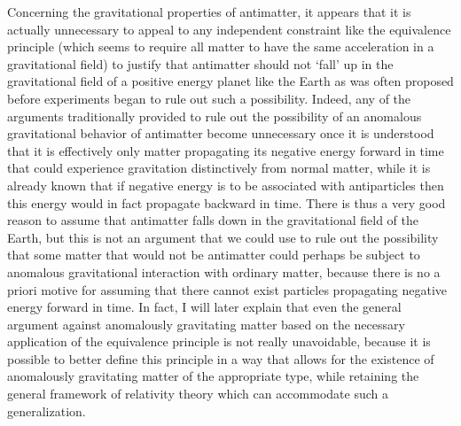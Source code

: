 \documentclass[notitlepage,12pt]{report}
\begin{document}
\noindent Concerning the gravitational properties of antimatter, it appears that it is actually unnecessary to appeal to any independent constraint like the equivalence principle (which seems to require all matter to have the same acceleration in a gravitational field) to justify that antimatter should not `fall' up in the gravitational field of a positive energy planet like the Earth as was often proposed before experiments began to rule out such a possibility. Indeed, any of the arguments traditionally provided to rule out the possibility of an anomalous gravitational behavior of antimatter become unnecessary once it is understood that it is effectively only matter propagating its negative energy forward in time that could experience gravitation distinctively from normal matter, while it is already known that if negative energy is to be associated with antiparticles then this energy would in fact propagate backward in time. There is thus a very good reason to assume that antimatter falls down in the gravitational field of the Earth, but this is not an argument that we could use to rule out the possibility that some matter that would not be antimatter could perhaps be subject to anomalous gravitational interaction with ordinary matter, because there is no a priori motive for assuming that there cannot exist particles propagating negative energy forward in time. In fact, I will later explain that even the general argument against anomalously gravitating matter based on the necessary application of the equivalence principle is not really unavoidable, because it is possible to better define this principle in a way that allows for the existence of anomalously gravitating matter of the appropriate type, while retaining the general framework of relativity theory which can accommodate such a generalization.
\end{document}
